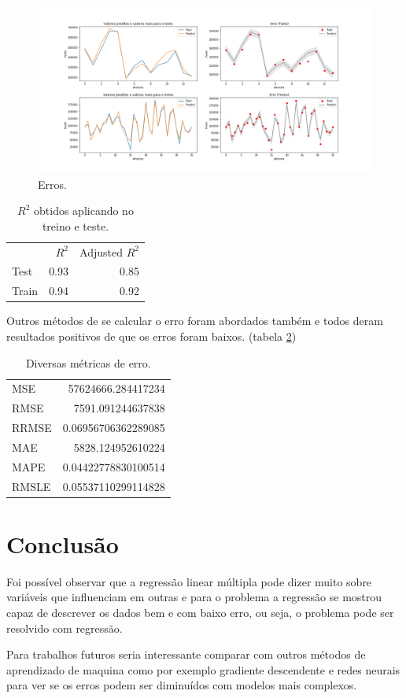 \documentclass[11pt]{article}
\begin{document}
\begin{figure}[htbp]
\centering
\includegraphics[width=.9\linewidth]{./error.png}
\caption{\label{fig:error}
Erros.}
\end{figure}

\begin{table}[htbp]
\centering
\begin{tabular}{lrr}
 & \(R^2\) & Adjusted \(R^2\)\\
Test & 0.93 & 0.85\\
Train & 0.94 & 0.92\\
\end{tabular}
\caption{\label{tab:r2}
\(R^2\) obtidos aplicando no treino e teste.}

\end{table}

Outros métodos de se calcular o erro foram abordados também e todos deram resultados positivos de que os erros foram baixos. (tabela \ref{tab:metrics})

\begin{table}[htbp]
\centering
\begin{tabular}{lr}
MSE & 57624666.284417234\\
RMSE & 7591.091244637838\\
RRMSE & 0.06956706362289085\\
MAE & 5828.124952610224\\
MAPE & 0.04422778830100514\\
RMSLE & 0.05537110299114828\\
\end{tabular}
\caption{\label{tab:metrics}
Diversas métricas de erro.}

\end{table}

\section{Conclusão}
\label{sec:orgf432795}

Foi possível observar que a regressão linear múltipla pode dizer muito sobre variáveis que influenciam em outras e para o problema a regressão se mostrou capaz de descrever os dados bem e com baixo erro, ou seja, o problema pode ser resolvido com regressão.

Para trabalhos futuros seria interessante comparar com outros métodos de aprendizado de maquina como por exemplo gradiente descendente e redes neurais para ver se os erros podem ser diminuídos com modelos mais complexos.
\end{document}
